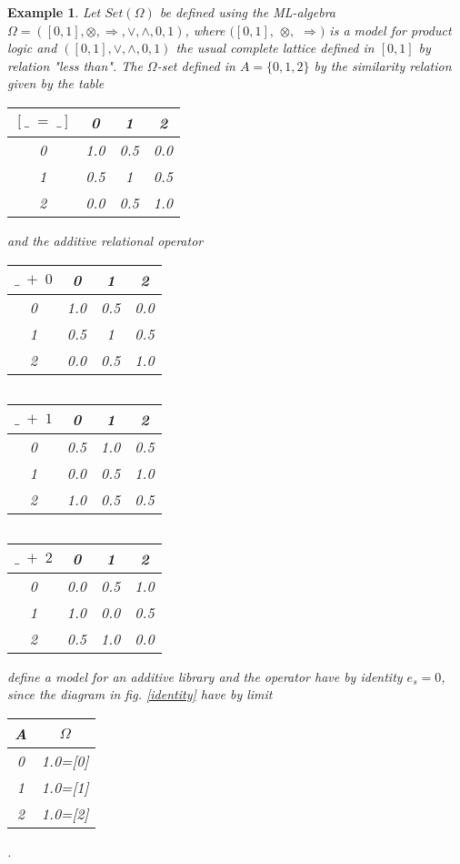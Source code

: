 \documentclass[oribibl]{llncs}
\newtheorem{exam}{Example}
\begin{document}
\begin{exam}
Let $Set(\Omega)$ be defined using the ML-algebra  $\Omega=([0,1],\otimes,\Rightarrow,\vee,\wedge,0,1)$, where  $([0,1],$ $\otimes,$ $\Rightarrow)$ is a model for product logic and $([0,1],\vee,\wedge,0,1)$ the usual complete lattice defined in $[0,1]$ by relation "less than". The $\Omega$-set defined in $A=\{0,1,2\}$ by the similarity relation given by the table
\begin{center}
\small
\begin{tabular}{c|ccc}
  $[\_\;=\;\_]$ & 0 & 1 & 2 \\
  \hline
  0 & 1.0 & 0.5 & 0.0 \\
  1 & 0.5 & 1 & 0.5 \\
  2 & 0.0 & 0.5 & 1.0 \\
\end{tabular}
\end{center}
and the additive relational operator
\begin{center}
\small
\begin{tabular}{c|ccc}
  $\_\;+\;0$ & 0 & 1 & 2 \\
  \hline
  0 & 1.0 & 0.5 & 0.0 \\
  1 & 0.5 & 1 & 0.5 \\
  2 & 0.0 & 0.5 & 1.0 \\
\end{tabular}$\;$
\begin{tabular}{c|ccc}
  $\_\;+\;1$ & 0 & 1 & 2 \\
  \hline
  0 & 0.5 & 1.0 & 0.5 \\
  1 & 0.0 & 0.5 & 1.0 \\
  2 & 1.0 & 0.5 & 0.5 \\
\end{tabular}$\;$
\begin{tabular}{c|ccc}
  $\_\;+\;2$ & 0 & 1 & 2 \\
  \hline
  0 & 0.0 & 0.5 & 1.0 \\
  1 & 1.0 & 0.0 & 0.5 \\
  2 & 0.5 & 1.0 & 0.0 \\
\end{tabular}
\end{center}
define a model for an additive library and the operator have by identity $e_s=0$, since the diagram in fig. \ref{identity} have by limit
\begin{center}
\small
\begin{tabular}{c|c}
  A & $\Omega$ \\
  \hline
  0 & 1.0=[0] \\
  1 & 1.0=[1] \\
  2 & 1.0=[2] \\
\end{tabular}
.
\end{center}
\end{exam}
\end{document}

